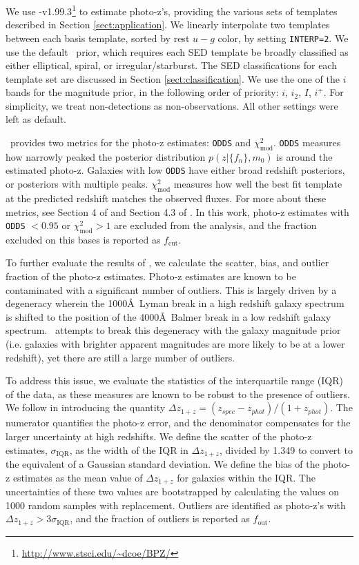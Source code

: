 We use \bpz-v1.99.3\footnote{\url{http://www.stsci.edu/~dcoe/BPZ/}} \citep{Benitez2000a} to estimate photo-z's, providing the various sets of templates described in Section \ref{sect:application}.
We linearly interpolate two templates between each basis template, sorted by rest $u-g$ color, by setting \texttt{INTERP=2}. 
We use the default \bpz\ prior, which requires each SED template be broadly classified as either elliptical, spiral, or irregular/starburst. 
The SED classifications for each template set are discussed in Section \ref{sect:classification}. 
We use the one of the $i$ bands for the magnitude prior, in the following order of priority: $i$, $i_2$, $I$, $i^+$.
For simplicity, we treat non-detections as non-observations.
All other settings were left as default.

\bpz\ provides two metrics for the photo-z estimates: \texttt{ODDS} and $\chi_{\text{mod}}^2$.
\texttt{ODDS} measures how narrowly peaked the posterior distribution $p(z|\{f_n\},m_0)$ is around the estimated photo-z.
Galaxies with low \texttt{ODDS} have either broad redshift posteriors, or posteriors with multiple peaks.
$\chi_{\text{mod}}^2$ measures how well the best fit template at the predicted redshift matches the observed fluxes. 
For more about these metrics, see Section 4 of \citet{Benitez2000a} and Section 4.3 of \citet{Coe2006a}.
In this work, photo-z estimates with \texttt{ODDS} $< 0.95$ or $\chi_{\text{mod}}^2 > 1$ are excluded from the analysis, and the fraction excluded on this bases is reported as $f_\text{cut}$.

To further evaluate the results of \bpz, we calculate the scatter, bias, and outlier fraction of the photo-z estimates. 
Photo-z estimates are known to be contaminated with a significant number of outliers.
This is largely driven by a degeneracy wherein the 1000\AA\ Lyman break in a high redshift galaxy spectrum is shifted to the position of the 4000\AA\ Balmer break in a low redshift galaxy spectrum. 
\bpz\ attempts to break this degeneracy with the galaxy magnitude prior (i.e. galaxies with brighter apparent magnitudes are more likely to be at a lower redshift), yet there are still a large number of outliers.

To address this issue, we evaluate the statistics of the interquartile range (IQR) of the data, as these measures are known to be robust to the presence of outliers.
We follow \citet{Graham2018a} in introducing the quantity $\Delta z_{1+z} = (z_{spec} - z_{phot})/(1 + z_{phot})$.
The numerator quantifies the photo-z error, and the denominator compensates for the larger uncertainty at high redshifts. 
We define the scatter of the photo-z estimates, $\sigma_\text{IQR}$,  as the width of the IQR in $\Delta z_{1+z}$, divided by 1.349 to convert to the equivalent of a Gaussian standard deviation. 
We define the bias of the photo-z estimates as the mean value of $\Delta z_{1+z}$ for galaxies within the IQR.
The uncertainties of these two values are bootstrapped by calculating the values on 1000 random samples with replacement. 
Outliers are identified as photo-z's with $\Delta z_{1+z} > 3 \sigma_{\text{IQR}}$, and the fraction of outliers is reported as $f_\text{out}$.


